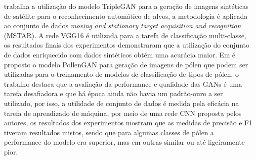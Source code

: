  trabalha a utilização do modelo TripleGAN para a geração de imagens sintéticas de satélite para o reconhecimento automático de alvos, a metodologia é aplicada ao conjunto de dados \textit{moving and stationary target acquisition and recognition} (MSTAR). A rede VGG16 é utilizada para a tarefa de classificação multi-classe, os resultados finais dos experimentos demonstraram que a utilização do conjunto de dados enriquecido com dados sintéticos obtém uma acurácia maior.
Em  é proposto o modelo PollenGAN para geração de imagens de pólen que podem ser utilizadas para o treinamento de modelos de classificação de tipos de pólen, o trabalho destaca que a avaliação da performance e qualidade das GANs é uma tarefa desafiadora e que há época ainda não havia um padrão-ouro a ser utilizado, por isso, a utilidade de conjunto de dados é medida pela eficácia na tarefa de aprendizado de máquina, por meio de uma rede CNN proposta pelos autores, os resultados dos experimentos mostram que as medidas de precisão e F1 tiveram resultados mistos, sendo que para algumas classes de pólen a performance do modelo era superior, mas em outras similar ou até ligeiramente pior.

